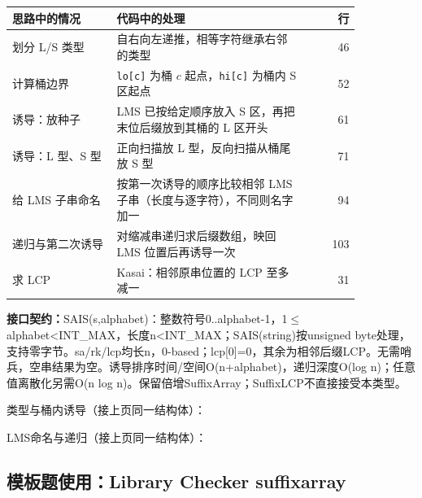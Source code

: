 \begin{center}\small
\begin{tabular}{@{}p{0.30\linewidth}p{0.55\linewidth}r@{}}
\toprule
思路中的情况 & 代码中的处理 & 行\\
\midrule
划分 L/S 类型 & 自右向左递推，相等字符继承右邻的类型 & 46\\
计算桶边界 & \texttt{lo[c]} 为桶 $c$ 起点，\texttt{hi[c]} 为桶内 S 区起点 & 52\\
诱导：放种子 & LMS 已按给定顺序放入 S 区，再把末位后缀放到其桶的 L 区开头 & 61\\
诱导：L 型、S 型 & 正向扫描放 L 型，反向扫描从桶尾放 S 型 & 71\\
给 LMS 子串命名 & 按第一次诱导的顺序比较相邻 LMS 子串（长度与逐字符），不同则名字加一 & 94\\
递归与第二次诱导 & 对缩减串递归求后缀数组，映回 LMS 位置后再诱导一次 & 103\\
求 LCP & Kasai：相邻原串位置的 LCP 至多减一 & 31\\
\bottomrule
\end{tabular}
\end{center}



{\sloppy{}\noindent\textbf{接口契约：}SAIS(s,alphabet)：整数符号0..alphabet-1，1$\le$alphabet<INT\_MAX，长度n<INT\_MAX；SAIS(string)按unsigned byte处理，支持零字节。sa/rk/lcp均长n，0-based；lcp[0]=0，其余为相邻后缀LCP。无需哨兵，空串结果为空。诱导排序时间/空间O(n+alphabet)，递归深度O(log n)；任意值离散化另需O(n log n)。保留倍增SuffixArray；SuffixLCP不直接接受本类型。\par}

\Needspace{506pt}



\newpage

\noindent 类型与桶内诱导（接上页同一结构体）：



\newpage

\noindent LMS命名与递归（接上页同一结构体）：



\Needspace{274pt}

\subsection*{模板题使用：Library Checker suffixarray}

